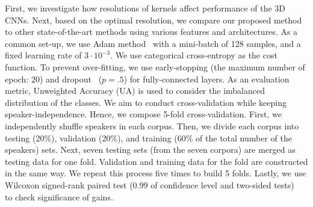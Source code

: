 \documentclass[conference, compsoc, twoside]{IEEEtran}
\begin{document}
First, we investigate how resolutions of kernels affect performance of the 3D CNNs. Next, based on the optimal resolution, we compare our proposed method to other state-of-the-art methods using various features and architectures. As a common set-up, we use Adam method~\cite{kingma2014adam} with a mini-batch of 128 samples, and a fixed learning rate of $3 \cdot 10^{-3}$. We use categorical cross-entropy as the cost function. To prevent over-fitting, we use early-stopping \cite{prechelt1998automatic} (the maximum number of epoch: $20$) and dropout~\cite{srivastava2014dropout} ($p =.5$) for fully-connected layers. As an evaluation metric, Unweighted Accuracy (UA) is used to consider the imbalanced distribution of the classes. We aim to conduct cross-validation while keeping speaker-independence. Hence, we compose 5-fold cross-validation. First, we independently shuffle speakers in each corpus. Then, we divide each corpus into testing (20\%), validation (20\%), and training (60\% of the total number of the speakers) sets. Next, seven testing sets (from the seven corpora) are merged as testing data for one fold. Validation and training data for the fold are constructed in the same way. We repeat this process five times to build 5 folds. Lastly, we use Wilcoxon signed-rank paired test ($0.99$ of confidence level and two-sided tests)~\cite{gibbons2011nonparametric} to check significance of gains.
\end{document}
